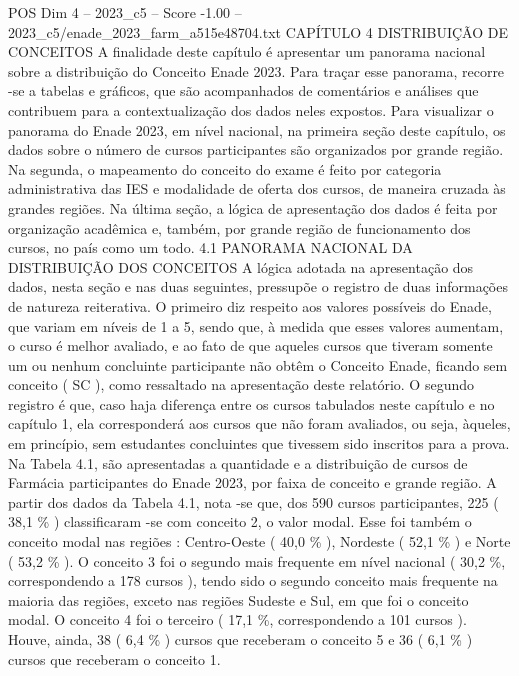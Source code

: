 \begin{textsample}{POS Dim 4 – 2023\_c5 – Score -1.00 – 2023\_c5/enade\_2023\_farm\_a515e48704.txt}  \label{ex:f4_pos_269}
CAPÍTULO 4 DISTRIBUIÇÃO DE CONCEITOS A finalidade deste capítulo é apresentar um panorama nacional sobre a distribuição do Conceito Enade 2023.
Para traçar esse panorama, recorre -se a tabelas e gráficos, que são acompanhados de comentários e análises que contribuem para a contextualização dos dados neles expostos.
Para visualizar o panorama do Enade 2023, em nível nacional, na primeira seção deste capítulo, os dados sobre o número de cursos participantes são organizados por grande região.
Na segunda, o mapeamento do conceito do exame é feito por categoria administrativa das IES e modalidade de oferta dos cursos, de maneira cruzada às grandes regiões.
Na última seção, a lógica de apresentação dos dados é feita por organização acadêmica e, também, por grande região de funcionamento dos cursos, no país como um todo. 4.1 PANORAMA NACIONAL DA DISTRIBUIÇÃO DOS CONCEITOS A lógica adotada na apresentação dos dados, nesta seção e nas duas seguintes, pressupõe o registro de duas informações de natureza reiterativa.
O primeiro diz respeito aos valores possíveis do Enade, que variam em níveis de 1 a 5, sendo que, à medida que esses valores aumentam, o curso é melhor avaliado, e ao fato de que aqueles cursos que tiveram somente um ou nenhum concluinte participante não obtêm o Conceito Enade, ficando sem conceito ( SC ), como ressaltado na apresentação deste relatório.
O segundo registro é que, caso haja diferença entre os cursos tabulados neste capítulo e no capítulo 1, ela corresponderá aos cursos que não foram avaliados, ou seja, àqueles, em princípio, sem estudantes concluintes que tivessem sido inscritos para a prova.
Na Tabela 4.1, são apresentadas a quantidade e a distribuição de cursos de Farmácia participantes do Enade 2023, por faixa de conceito e grande região.
A partir dos dados da Tabela 4.1, nota -se que, dos 590 cursos participantes, 225 ( 38,1 \% ) classificaram -se com conceito 2, o valor modal.
Esse foi também o conceito modal nas regiões : Centro-Oeste ( 40,0 \% ), Nordeste ( 52,1 \% ) e Norte ( 53,2 \% ).
O conceito 3 foi o segundo mais frequente em nível nacional ( 30,2 \%, correspondendo a 178 cursos ), tendo sido o segundo conceito mais frequente na maioria das regiões, exceto nas regiões Sudeste e Sul, em que foi o conceito modal.
O conceito 4 foi o terceiro ( 17,1 \%, correspondendo a 101 cursos ).
Houve, ainda, 38 ( 6,4 \% ) cursos que receberam o conceito 5 e 36 ( 6,1 \% ) cursos que receberam o conceito 1.

\end{textsample}
